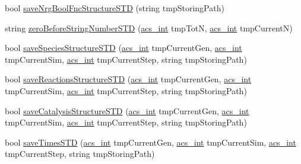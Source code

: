 \begin{DoxyCompactItemize}
\item 
bool \hyperlink{classenvironment_a1412b9b1c3bd3e42bcb481f5e18ea931}{save\-Nrg\-Bool\-Fnc\-Structure\-S\-T\-D} (string tmp\-Storing\-Path)
\item 
string \hyperlink{classenvironment_a8699a0f85f5e8dc23eb8f78fa22c6b17}{zero\-Before\-String\-Number\-S\-T\-D} (\hyperlink{acs__headers_8h_a8d277355641a098190360234e2ebde35}{acs\-\_\-int} tmp\-Tot\-N, \hyperlink{acs__headers_8h_a8d277355641a098190360234e2ebde35}{acs\-\_\-int} tmp\-Current\-N)
\item 
bool \hyperlink{classenvironment_a9daeb4f255100b8ad59de9ea80b19b5b}{save\-Species\-Structure\-S\-T\-D} (\hyperlink{acs__headers_8h_a8d277355641a098190360234e2ebde35}{acs\-\_\-int} tmp\-Current\-Gen, \hyperlink{acs__headers_8h_a8d277355641a098190360234e2ebde35}{acs\-\_\-int} tmp\-Current\-Sim, \hyperlink{acs__headers_8h_a8d277355641a098190360234e2ebde35}{acs\-\_\-int} tmp\-Current\-Step, string tmp\-Storing\-Path)
\item 
bool \hyperlink{classenvironment_ad381c4ce24045d504539bb7c74800739}{save\-Reactions\-Structure\-S\-T\-D} (\hyperlink{acs__headers_8h_a8d277355641a098190360234e2ebde35}{acs\-\_\-int} tmp\-Current\-Gen, \hyperlink{acs__headers_8h_a8d277355641a098190360234e2ebde35}{acs\-\_\-int} tmp\-Current\-Sim, \hyperlink{acs__headers_8h_a8d277355641a098190360234e2ebde35}{acs\-\_\-int} tmp\-Current\-Step, string tmp\-Storing\-Path)
\item 
bool \hyperlink{classenvironment_a0a799b3a42bd90845a915298e184708c}{save\-Catalysis\-Structure\-S\-T\-D} (\hyperlink{acs__headers_8h_a8d277355641a098190360234e2ebde35}{acs\-\_\-int} tmp\-Current\-Gen, \hyperlink{acs__headers_8h_a8d277355641a098190360234e2ebde35}{acs\-\_\-int} tmp\-Current\-Sim, \hyperlink{acs__headers_8h_a8d277355641a098190360234e2ebde35}{acs\-\_\-int} tmp\-Current\-Step, string tmp\-Storing\-Path)
\item 
bool \hyperlink{classenvironment_a73e83c4fcfe612514714a6692270351e}{save\-Times\-S\-T\-D} (\hyperlink{acs__headers_8h_a8d277355641a098190360234e2ebde35}{acs\-\_\-int} tmp\-Current\-Gen, \hyperlink{acs__headers_8h_a8d277355641a098190360234e2ebde35}{acs\-\_\-int} tmp\-Current\-Sim, \hyperlink{acs__headers_8h_a8d277355641a098190360234e2ebde35}{acs\-\_\-int} tmp\-Current\-Step, string tmp\-Storing\-Path)
\item 

\end{DoxyCompactItemize}
